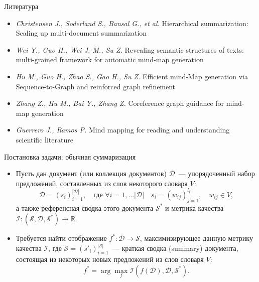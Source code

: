 \documentclass{beamer}
\newcommand{\D}{\mathcal{D}}
\renewcommand{\S}{\mathcal{S}}
\newcommand{\I}{\mathcal{I}}
\newcommand{\R}{\mathbb{R}}
\begin{document}

\begin{frame}{Литература}

\begin{itemize}
    \item \emph{Christensen J., Soderland S., Bansal G., et al.} Hierarchical summarization: Scaling up multi-document summarization

    \item \emph{Wei Y., Guo H., Wei J.-M., Su Z.} Revealing semantic structures of texts: multi-grained framework for automatic mind-map generation

    \item \emph{Hu M., Guo H., Zhao S., Gao H., Su Z.} Efficient mind-Map generation via Sequence-to-Graph and reinforced graph refinement

    \item \emph{Zhang Z., Hu M., Bai Y., Zhang Z.} Coreference graph guidance for mind-map generation
    
    \item \emph{Guerrero J., Ramos P.} Mind mapping for reading and understanding scientific literature 
\end{itemize}
    
\end{frame}


\begin{frame}{Постановка задачи: обычная суммаризация}

\begin{itemize}
    \item Пусть дан документ (или коллекция документов) $\D$~--- упорядоченный набор предложений, составленных из слов некоторого словаря $V$: 
    $$
    \D = \left(s_i\right)_{i=1}^{|\D|},\quad \text{где } \forall i=1,\dots |\D|\quad s_i = \left(w_{ij}\right)_{j=1}^{l_i}, \quad w_{ij}\in V,
    $$
    а также референсная сводка этого документа $\S^*$ и метрика качества $\I: (\S, \D, \S^*) \rightarrow \R$.
    \item Требуется найти отображение $f^*: \D \rightarrow \S$, максимизирующее данную метрику качества $\I$, где $\S = \left(s'_i\right)_{i=1}^{|\S|}$~--- краткая сводка (summary) документа, состоящая из некоторых новых предложений из слов словаря $V$:
    $$
    f^* = \arg\max\limits_{f} \I(f(\D), \D, \S^*).
    $$
\end{itemize}

\end{frame}
\end{document}
